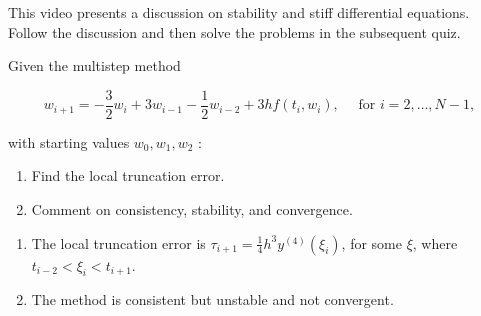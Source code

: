 \begin{youtube}
This video presents a discussion on stability and stiff differential equations. Follow the discussion and then solve the problems in the subsequent quiz.
\end{youtube}




\begin{myexercise}%
Given the multistep method

$$
w_{i+1}=-\frac{3}{2} w_{i}+3 w_{i-1}-\frac{1}{2} w_{i-2}+3 h f\left(t_{i}, w_{i}\right), \quad \text { for } i=2, \ldots, N-1,
$$

with starting values $w_{0}, w_{1}, w_{2}$ :
\begin{enumerate}[label=(\alph*)]
\item  Find the local truncation error.
\item Comment on consistency, stability, and convergence.
\end{enumerate}

\begin{mysolution}


\begin{enumerate}[label=(\alph*)]
\item The local truncation error is $\tau_{i+1}=\frac{1}{4} h^{3} y^{(4)}\left(\xi_{i}\right)$, for some $\xi$, where $t_{i-2}<\xi_{i}<t_{i+1}$.\\
\item The method is consistent but unstable and not convergent.
\end{enumerate}
\end{mysolution}
\end{myexercise}




